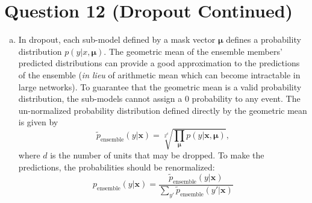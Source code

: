 \documentclass[fleqn]{article}
\begin{document}
\section*{Question 12 (Dropout Continued)}
\begin{enumerate}[a)]
	\item
	In dropout, each sub-model defined by a mask vector $\bm{\mu}$ defines a probability distribution $p(y | x, \bm{\mu})$. The geometric mean of the ensemble members' predicted distributions can provide a good approximation to the predictions of the ensemble (\textit{in lieu} of arithmetic mean which can become intractable in large networks). To guarantee that the geometric mean is a valid probability distribution, the sub-models cannot assign a 0 probability to any event. The un-normalized probability distribution defined directly by the geometric mean is given by
	\begin{equation*}
		\tilde{p}_{\text{ensemble}} (y|\bm{x}) = \sqrt [2^d]{\prod_{\bm{\mu}} p(y | \bm{x, \mu})},
	\end{equation*}
	where $d$ is the number of units that may be dropped. To make the predictions, the probabilities should  be renormalized:
	\begin{equation*}
		p_{\text{ensemble}}(y | \bm{x}) = \frac{\tilde{p}_{\text{ensemble}} (y | \bm{x}) } { \sum_{y'} \tilde{p}_{\text{ensemble}} (y' | \bm{x})}
	\end{equation*}
	

\end{enumerate}
\end{document}
